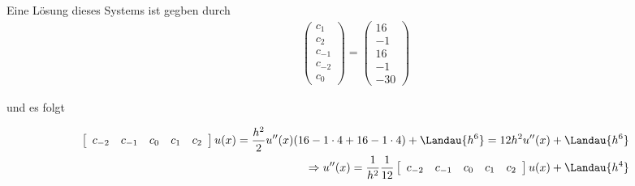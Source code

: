 \begin{solution}
  Eine Lösung dieses Systems ist gegben durch
  \begin{align*}
  \begin{pmatrix}
    c_1 \\
    c_2 \\
    c_{-1} \\
    c_{-2} \\
    c_{0}
  \end{pmatrix} =
  \begin{pmatrix}
    16 \\ -1 \\ 16 \\ -1 \\ -30
  \end{pmatrix}
  \end{align*}

  und es folgt

  \begin{align*}
  \left[
  \begin{array}{ccccc}
  c_{-2} & c_{-1} & c_0 & c_1 & c_ 2
  \end{array}
  \right]
  u(x) = \frac{h^2}{2}u''(x)(16 - 1\cdot 4 + 16 - 1 \cdot 4) + \Landau{h^6} = 12 h^2 u''(x) + \Landau{h^6} \\
  \Rightarrow u''(x) = \frac{1}{h^2} \frac{1}{12} \left[
  \begin{array}{ccccc}
  c_{-2} & c_{-1} & c_0 & c_1 & c_ 2
  \end{array}
  \right] u(x) + \Landau{h^4}
  \end{align*}

\end{solution}
